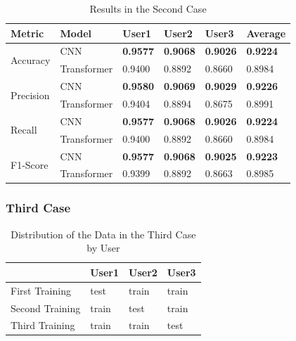 \begin{table}[H]
    \centering
    \caption{Results in the Second Case}
    \label{table:results_second_case}
    \begin{tabular}{|l|l|l|l|l|l|}
        \hline
        Metric & Model & User1 & User2 & User3 & Average \\
        \hline \hline
        \multirow{2}{*}{Accuracy} & CNN & \textbf{0.9577} & \textbf{0.9068} & \textbf{0.9026} & \textbf{0.9224} \\
        \cline{2-6}
        & Transformer & 0.9400 & 0.8892 &  0.8660 & 0.8984 \\
        \hline \hline
        \multirow{2}{*}{Precision} & CNN & \textbf{0.9580} & \textbf{0.9069} & \textbf{0.9029} & \textbf{0.9226} \\
        \cline{2-6}
        & Transformer & 0.9404 & 0.8894 & 0.8675 & 0.8991 \\
        \hline \hline
        \multirow{2}{*}{Recall} & CNN & \textbf{0.9577} & \textbf{0.9068} & \textbf{0.9026} & \textbf{0.9224} \\
        \cline{2-6}
        & Transformer & 0.9400 & 0.8892 & 0.8660 & 0.8984 \\
        \hline \hline
        \multirow{2}{*}{F1-Score} & CNN & \textbf{0.9577} & \textbf{0.9068} & \textbf{0.9025} & \textbf{0.9223} \\
        \cline{2-6}
        & Transformer & 0.9399 & 0.8892 & 0.8663 & 0.8985 \\
        \hline
    \end{tabular}
\end{table}

\subsubsection{Third Case}

\begin{table}[H]
    \centering
    \caption{Distribution of the Data in the Third Case by User}
    \label{table:data_distribution_third_case}
    \begin{tabular}{|l|l|l|l|}
        \hline
        & User1 & User2 & User3 \\
        \hline
        First Training & test & train & train \\
        \hline
        Second Training & train & test & train \\
        \hline
        Third Training & train & train & test \\
        \hline
    \end{tabular}
\end{table}

